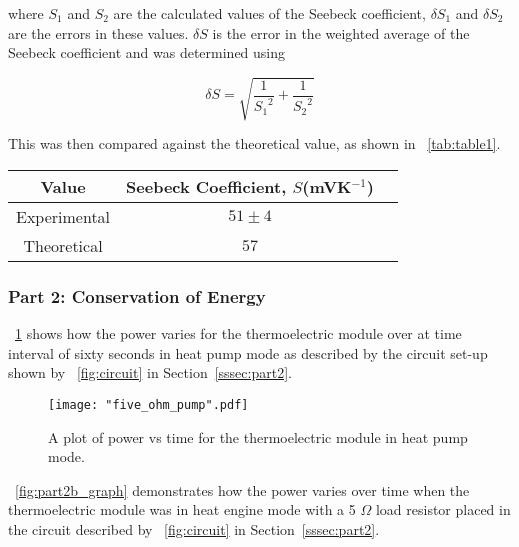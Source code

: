 \documentclass{article}
\newcommand{\figref}[2][\figurename~]{#1\ref{#2}}
\newcommand{\tabref}[2][\tablename~]{#1\ref{#2}}
\newcommand{\secref}[2][Section~]{#1\ref{#2}}
\begin{document}
\vspace{2mm}
\noindent
where $S_1$ and $S_2$ are the calculated values of the Seebeck coefficient, $\delta S_1$ and $\delta S_2$ are the errors in these values. $\delta S$ is the error in the weighted average of the Seebeck coefficient and was determined using

\begin{equation}
\label{eq:seebeck-error}
\delta S = \sqrt{\frac{1}{{S_1}^2} + \frac{1}{{S_2}^2}}
\end{equation}

\vspace{2mm}
\noindent
This was then compared against the theoretical value, as shown in \tabref{tab:table1}.

\vspace{5mm}
\begin{table*}[h]
\centering %
\caption{Table of calculated and published values for the Seebeck coefficient of the thermoelectric module.}
\label{tab:table1}
\begin{tabular}{|c|c|c|}
\hline
Value & Seebeck Coefficient, $S$(mVK$^{-1}$) \\
\hline
Experimental & $51 \pm 4$ \\
\hline
Theoretical \cite{Paper02} & $57$ \\
\hline
\end{tabular}
\end{table*}

\newpage
\subsubsection{Part 2: Conservation of Energy}
\label{sssec:part2_results}

\figref{fig:part2a_graph} shows how the power varies for the thermoelectric module over at time interval of sixty seconds in heat pump mode as described by the circuit set-up shown by  \figref{fig:circuit} in \secref{sssec:part2}.

\begin{figure}[h]
\centering
\texttt{[image: "five\_ohm\_pump".pdf]}
\caption{A plot of power vs time for the thermoelectric module in heat pump mode.}
\label{fig:part2a_graph}
\end{figure}

\vspace{2mm}
\noindent
\figref{fig:part2b_graph} demonstrates how the power varies over time when the thermoelectric module was in heat engine mode with a 5 $\Omega$ load resistor placed in the circuit described by \figref{fig:circuit} in \secref{sssec:part2}.
\end{document}
